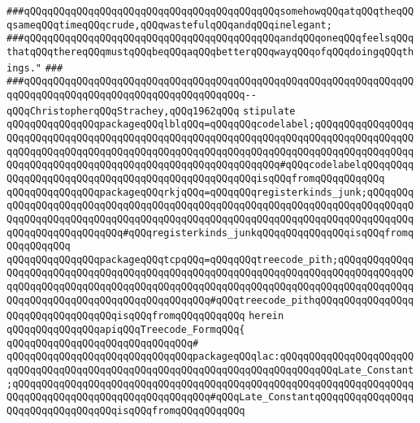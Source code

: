 \verb|###qQQqqQQqqQQqqQQqqQQqqQQqqQQqqQQqqQQqqQQqqQQqsomehowqQQqatqQQqtheqQQqsameqQQqtimeqQQqcrude,qQQqwastefulqQQqandqQQqinelegant;|\newline
\verb|###qQQqqQQqqQQqqQQqqQQqqQQqqQQqqQQqqQQqqQQqqQQqandqQQqoneqQQqfeelsqQQqthatqQQqthereqQQqmustqQQqbeqQQqaqQQqbetterqQQqwayqQQqofqQQqdoingqQQqthings."|\newline
\verb|###|\newline
\verb|###qQQqqQQqqQQqqQQqqQQqqQQqqQQqqQQqqQQqqQQqqQQqqQQqqQQqqQQqqQQqqQQqqQQqqQQqqQQqqQQqqQQqqQQqqQQqqQQqqQQqqQQqqQQq--qQQqChristopherqQQqStrachey,qQQq1962qQQq|\newline
\newline
\newline
\verb|stipulate|\newline
\verb|qQQqqQQqqQQqqQQqpackageqQQqlblqQQq=qQQqqQQqcodelabel;qQQqqQQqqQQqqQQqqQQqqQQqqQQqqQQqqQQqqQQqqQQqqQQqqQQqqQQqqQQqqQQqqQQqqQQqqQQqqQQqqQQqqQQqqQQqqQQqqQQqqQQqqQQqqQQqqQQqqQQqqQQqqQQqqQQqqQQqqQQqqQQqqQQqqQQqqQQqqQQqqQQqqQQqqQQqqQQqqQQqqQQqqQQqqQQqqQQqqQQqqQQq#qQQqcodelabelqQQqqQQqqQQqqQQqqQQqqQQqqQQqqQQqqQQqqQQqqQQqqQQqqQQqisqQQqfromqQQqqQQqqQQq|\newline
\verb|qQQqqQQqqQQqqQQqpackageqQQqrkjqQQq=qQQqqQQqregisterkinds_junk;qQQqqQQqqQQqqQQqqQQqqQQqqQQqqQQqqQQqqQQqqQQqqQQqqQQqqQQqqQQqqQQqqQQqqQQqqQQqqQQqqQQqqQQqqQQqqQQqqQQqqQQqqQQqqQQqqQQqqQQqqQQqqQQqqQQqqQQqqQQqqQQqqQQqqQQqqQQqqQQqqQQqqQQq#qQQqregisterkinds_junkqQQqqQQqqQQqqQQqisqQQqfromqQQqqQQqqQQq|\newline
\verb|qQQqqQQqqQQqqQQqpackageqQQqtcpqQQq=qQQqqQQqtreecode_pith;qQQqqQQqqQQqqQQqqQQqqQQqqQQqqQQqqQQqqQQqqQQqqQQqqQQqqQQqqQQqqQQqqQQqqQQqqQQqqQQqqQQqqQQqqQQqqQQqqQQqqQQqqQQqqQQqqQQqqQQqqQQqqQQqqQQqqQQqqQQqqQQqqQQqqQQqqQQqqQQqqQQqqQQqqQQqqQQqqQQqqQQqqQQq#qQQqtreecode_pithqQQqqQQqqQQqqQQqqQQqqQQqqQQqqQQqqQQqisqQQqfromqQQqqQQqqQQq|\newline
\verb|herein|\newline
\newline
\verb|qQQqqQQqqQQqqQQqapiqQQqTreecode_FormqQQq{|\newline
\verb|qQQqqQQqqQQqqQQqqQQqqQQqqQQqqQQq#|\newline
\verb|qQQqqQQqqQQqqQQqqQQqqQQqqQQqqQQqpackageqQQqlac:qQQqqQQqqQQqqQQqqQQqqQQqqQQqqQQqqQQqqQQqqQQqqQQqqQQqqQQqqQQqqQQqqQQqqQQqqQQqqQQqLate_Constant;qQQqqQQqqQQqqQQqqQQqqQQqqQQqqQQqqQQqqQQqqQQqqQQqqQQqqQQqqQQqqQQqqQQqqQQqqQQqqQQqqQQqqQQqqQQqqQQqqQQqqQQq#qQQqLate_ConstantqQQqqQQqqQQqqQQqqQQqqQQqqQQqqQQqqQQqisqQQqfromqQQqqQQqqQQq|\newline
